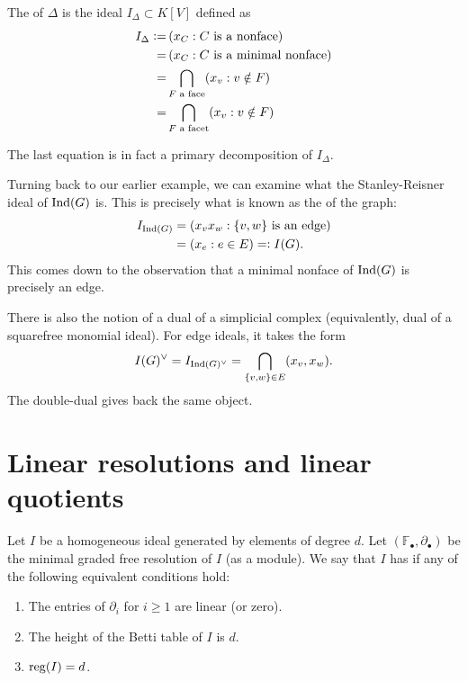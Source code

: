 \documentclass[12pt]{article}
\begin{document}
\begin{defn}
	 The  of $\Delta$ is the ideal $I_{\Delta} \subset K[V]$ defined as
	\begin{align*} 
		I_{\Delta} \vcentcolon=&\, (x_{C} : C \text{ is a nonface}) \\
		=&\, (x_{C} : C \text{ is a minimal nonface}) \\
		=& \bigcap_{F \text{ a face}} (x_{v} : v \notin F) \\
		=& \bigcap_{F \text{ a facet}} (x_{v} : v \notin F) 
	\end{align*}
\end{defn}
The last equation is in fact a primary decomposition of $I_{\Delta}$.

\begin{ex} \label{ex:edge-ideal-and-dual}
	Turning back to our earlier example, we can examine what the Stanley-Reisner ideal of $\operatorname{Ind}(G)$ is. This is precisely what is known as the  of the graph:
	\begin{align*} 
		I_{\operatorname{Ind}(G)} &= (x_{v} x_{w} : \{v, w\} \text{ is an edge}) \\
		&= (x_{e} : e \in E) =\vcentcolon I(G).
	\end{align*}
	This comes down to the observation that a minimal nonface of $\operatorname{Ind}(G)$ is precisely an edge.

	There is also the notion of a dual of a simplicial complex (equivalently, dual of a squarefree monomial ideal). For edge ideals, it takes the form
	\begin{equation*} 
		I(G)^{\vee} = I_{\operatorname{Ind}(G)^{\vee}} = \bigcap_{\{v, w\} \in E} (x_{v}, x_{w}).
	\end{equation*}
	The double-dual gives back the same object.
\end{ex}

\section{Linear resolutions and linear quotients}

Let $I$ be a homogeneous ideal generated by elements of degree $d$. Let $(\mathbb{F}_{\bullet}, \partial_{\bullet})$ be the minimal graded free resolution of $I$ (as a module). We say that $I$ has  if any of the following equivalent conditions hold:
\begin{enumerate}[label=(\alph*)]
	\item The entries of $\partial_{i}$ for $i \ge 1$ are linear (or zero).
	\item The height of the Betti table of $I$ is $d$. 
	\item $\operatorname{reg}(I) = d$.
\end{enumerate}
\end{document}
